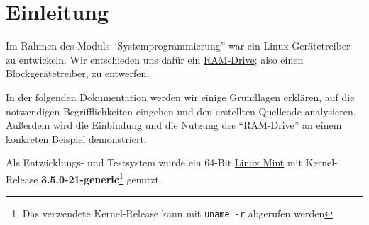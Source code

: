 \section{Einleitung}
\label{sec:einleitung}

Im Rahmen des Moduls \enquote{Systemprogrammierung} war ein Linux-Gerätetreiber zu entwickeln. Wir entschieden uns dafür ein \href{http://en.wikipedia.org/wiki/RAM_drive}{RAM-Drive}; also einen Blockgerätetreiber, zu entwerfen.

In der folgenden Dokumentation werden wir einige Grundlagen erklären, auf die notwendigen Begrifflichkeiten eingehen und den erstellten Quellcode analysieren. Außerdem wird die Einbindung und die Nutzung des \enquote{RAM-Drive} an einem konkreten Beispiel demonstriert.

Als Entwicklungs- und Testsystem wurde ein 64-Bit \href{http://www.linuxmint.com/}{Linux Mint} mit Kernel-Release \textbf{3.5.0-21-generic}\footnote{Das verwendete Kernel-Release kann mit \texttt{uname -r} abgerufen werden} genutzt.